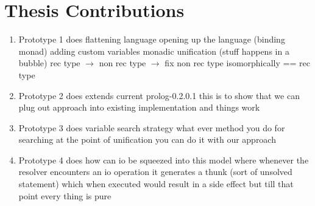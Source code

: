 \documentclass[proposal.tex]{subfiles}
\begin{document}
\section{Thesis Contributions}

\begin{enumerate}
\item Prototype 1 does 
flattening language
opening up the language (binding monad)
adding custom variables
monadic unification (stuff happens in a bubble)
rec type $\rightarrow$ non rec type $\rightarrow$ fix non rec type isomorphically == rec type




\item Prototype 2 does
extends current prolog-0.2.0.1
this is to show that we can plug out approach into existing implementation and things work

\item Prototype 3 does
variable search strategy
what ever method you do for searching at the point of unification you can do it with our approach

\item Prototype 4 does
how can io be squeezed into this model where whenever the resolver encounters an io operation it generates a thunk (sort of unsolved 
statement) which when executed would result in a side effect but till that point every thing is pure

\end{enumerate}
\end{document}
